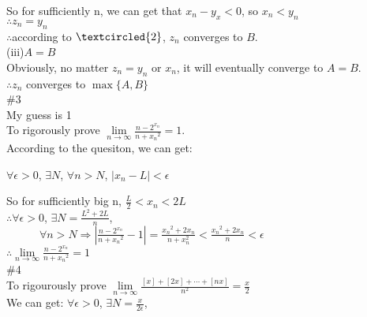 \documentclass{article}
\begin{document}
So for sufficiently n, we can get that $x_n-y_x<0$, so $x_n<y_n$\\

$\therefore$\qquad $z_n=y_n$\\

$\therefore$\qquad according to $\textcircled{2}$, $z_n$ converges to $B$.\\

(iii)$A=B$\\

Obviously, no matter $z_n=y_n$ or $x_n$, it will eventually converge to $A=B$.\\

$\therefore$\qquad$z_n$ converges to $\max\{A,B\}$\\

\textcolor[rgb]{0.00,0.00,0.50}{\#3}\\

My guess is 1\\

To rigorously prove $\lim \limits_{n \to \infty}\frac{n-2^{x_n}}{n+{x_n}^2} = 1$.\\

According to the quesiton, we can get:\\

\centerline{$\forall\epsilon>0$, $\exists N$, $\forall n>N$, $\left|x_n-L\right|<\epsilon$}

\vspace{3.5mm}

So for sufficiently big n, $\frac{L}{2}<x_n<2L$\\

$\therefore$\qquad$\forall\epsilon>0$, $\exists N=\frac{L^2+2L}{n}$,\\

$\qquad\quad\forall n>N\Rightarrow\left|\frac{n-2^{x_n}}{n+{x_n}^2}-1\right|=\frac{{x_n}^2+2x_n}{n+{x_n^2}}<\frac{{x_n}^2+2x_n}{n}<\epsilon$\\

$\therefore$\qquad$\lim \limits_{n \to \infty}\frac{n-2^{x_n}}{n+{x_n}^2}=1$\\

\textcolor[rgb]{0.00,0.00,0.50}{\#4}\\

To rigourously prove $\lim \limits_{n \to \infty}\frac{[x]+[2x]+\cdots +[nx]}{n^2}=\frac{x}{2}$\\

We can get: $\forall\epsilon>0$, $\exists N=\frac{x}{2\epsilon}$,\\
\end{document}
